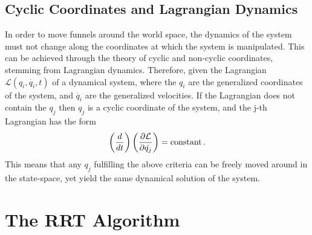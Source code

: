 \subsection{Cyclic Coordinates and Lagrangian Dynamics}
\label{subsec:cyclic-coordinates}

In order to move funnels around the world space, the dynamics of the system must
not change along the coordinates at which the system is manipulated. This can be
achieved through the theory of cyclic and non-cyclic coordinates, stemming from
Lagrangian dynamics. Therefore, given the Lagrangian \(\mathcal{L}(q_i,
\dot{q_i}, t)\) of a dynamical system, where the \(q_i\) are the generalized
coordinates of the system, and \(\dot{q_i}\) are the generalized velocities. If
the Lagrangian does not contain the \(q_j\) then \(q_j\) is a cyclic coordinate
of the system, and the j-th Lagrangian has the form
\[
  \left( \frac{d}{dt} \right) \left( \frac{\partial \mathcal{L}}{\partial
      \dot{q_j}} \right) = \mathrm{constant} \, .
\]
This means that any \(q_j\) fulfilling the above criteria can be freely moved
around in the state-space, yet yield the same dynamical solution of the system.

\section{The RRT Algorithm}
\label{sec:rrt-algorithm-intro}

